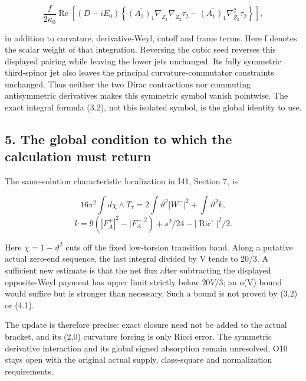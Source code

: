 \documentclass[
  10pt,
]{article}
\begin{document}
\[
 \frac{f}{2\kappa_0}\operatorname{Re}\left[(D-iE_0)
 \left\{\overline{(A_2)_1}\nabla_{\overline Z_1}
                          \nabla_{\overline Z_2}\tau_2
       -\overline{(A_1)_1}\nabla_{\overline Z_2}^2\tau_2\right\}\right],
\]

in addition to curvature, derivative-Weyl, cutoff and frame terms. Here
f denotes the scalar weight of that integration. Reversing the cubic
seed reverses this displayed pairing while leaving the lower jets
unchanged. Its fully symmetric third-spinor jet also leaves the
principal curvature-commutator constraints unchanged. Thus neither the
two Dirac contractions nor commuting antisymmetric derivatives makes
this symmetric symbol vanish pointwise. The exact integral formula
(3.2), not this isolated symbol, is the global identity to use.

\hypertarget{the-global-condition-to-which-the-calculation-must-return}{%
\subsection{5. The global condition to which the calculation must
return}\label{the-global-condition-to-which-the-calculation-must-return}}

The same-solution characteristic localization in I41, Section 7, is

\[
 16\pi^2\int d\chi\wedge T_\tau
     =2\int\vartheta^2|W^-|^2+\int\vartheta^2 k,
\] \[
 k=9(|F_A^+|^2-|F_A^-|^2)+s^2/24
                                -|\operatorname{Ric}^{\circ}|^2/2.
\]

Here \(\chi=1-\vartheta^2\) cuts off the fixed low-torsion transition
band. Along a putative actual zero-end sequence, the last integral
divided by V tends to 20/3. A sufficient new estimate is that the net
flux after subtracting the displayed opposite-Weyl payment has upper
limit strictly below \(20V/3\); an o(V) bound would suffice but is
stronger than necessary. Such a bound is not proved by (3.2) or (4.1).

The update is therefore precise: exact closure need not be added to the
actual bracket, and its (2,0) curvature forcing is only Ricci error. The
symmetric derivative interaction and its global signed absorption remain
unresolved. O10 stays open with the original actual supply, class-square
and normalization requirements.
\end{document}
